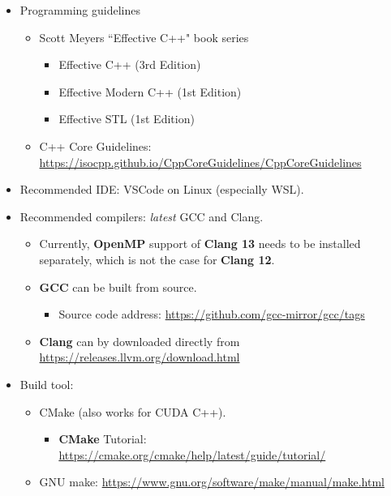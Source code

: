 \documentclass{article}
\begin{document}
\begin{itemize}
\begin{itemize}
        \item Programming guidelines
        \begin{itemize}
            \item Scott Meyers ``Effective C++" book series
            \begin{itemize}
                \item Effective C++ (3rd Edition) \cite{meyers2005effective}
                \item Effective Modern C++ (1st Edition) \cite{meyers2014effective}
                \item Effective STL (1st Edition) \cite{meyers2001effective}
            \end{itemize}
            \item C++ Core Guidelines:\\ \href{https://isocpp.github.io/CppCoreGuidelines/CppCoreGuidelines}{https://isocpp.github.io/CppCoreGuidelines/CppCoreGuidelines}
        \end{itemize}
        \item Recommended IDE: VSCode on Linux (especially WSL).
        \item Recommended compilers: \emph{latest} GCC and Clang.
        \begin{itemize}
            \item Currently, \textbf{OpenMP} support of \textbf{Clang 13} needs to be installed separately, which is not the case for \textbf{Clang 12}.
            \item \textbf{GCC} can be built from source.
            \begin{itemize}
                \item Source code address:
                \href{https://github.com/gcc-mirror/gcc/tags}{https://github.com/gcc-mirror/gcc/tags}
            \end{itemize}
            \item \textbf{Clang} can by downloaded directly from \href{https://releases.llvm.org/download.html}{https://releases.llvm.org/download.html}
        \end{itemize}
        \item Build tool: 
        \begin{itemize}
            \item CMake (also works for CUDA C++).
                \begin{itemize}
                \item \textbf{CMake} Tutorial:
                \href{https://cmake.org/cmake/help/latest/guide/tutorial/}{https://cmake.org/cmake/help/latest/guide/tutorial/}
                \end{itemize}
            \item GNU make:
            \href{https://www.gnu.org/software/make/manual/make.html}{https://www.gnu.org/software/make/manual/make.html}
        \end{itemize}
        

\end{itemize}
\end{itemize}
\end{document}
